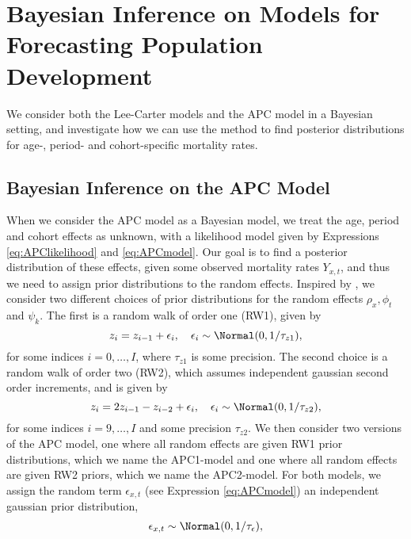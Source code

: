 \newpage
\section{Bayesian Inference on Models for Forecasting Population Development}
\label{sec:BayesianInference}
We consider both the Lee-Carter models and the APC model in a Bayesian setting, and investigate how we can use the \inla method to find posterior distributions for age-, period- and cohort-specific mortality rates. 


\subsection{Bayesian Inference on the APC Model}
\label{sec:BayesianInferenceAPC}
When we consider the APC model as a Bayesian model, we treat the age, period and cohort effects as unknown, with a likelihood model given by Expressions \ref{eq:APClikelihood} and \ref{eq:APCmodel}. Our goal is to find a posterior distribution of these effects, given some observed mortality rates $Y_{x,t}$, and thus we need to assign prior distributions to the random effects. Inspired by \parencite{RieblerThesis2010}, we consider two different choices of prior distributions for the random effects $\rho_x, \phi_t$ and $\psi_k$. The first is a random walk of order one (RW1), given by
\begin{equation}
    z_i = z_{i-1} + \epsilon_i, \quad \epsilon_i \sim \Normal(0,1/\tau_{z1}),
    \label{eq:APCrw1}
\end{equation}
for some indices $i = 0,\ldots,I$, where $\tau_{z1}$ is some precision. The second choice is a random walk of order two (RW2), which assumes independent gaussian second order increments, and is given by
\begin{equation}
    z_i = 2z_{i-1} - z_{i-2} + \epsilon_i, \quad \epsilon_i \sim \Normal(0, 1/\tau_{z2}),
    \label{eq:APCrw2}
\end{equation}
for some indices $i = 9,\ldots,I$ and some precision $\tau_{z2}$. We then consider two versions of the APC model, one where all random effects are given RW1 prior distributions, which we name the APC1-model and one where all random effects are given RW2 priors, which we name the APC2-model. For both models, we assign the random term $\epsilon_{x,t}$ (see Expression \ref{eq:APCmodel}) an independent gaussian prior distribution,
\begin{equation}
    \epsilon_{x,t} \sim \Normal(0,1/\tau_\epsilon),
\end{equation}
